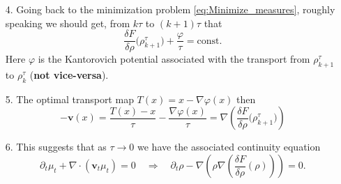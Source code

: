 \begin{enumerate}
    \item[4.] Going back to the minimization problem \eqref{eq:Minimize_measures}, roughly speaking we should get, from $k\tau$ to $(k+1)\tau$ that
    \begin{equation*}
        \frac{\delta F}{\delta \rho}\big(\rho_{k+1}^\tau\big) + \frac{\varphi}{\tau} = \mathrm{const}.
    \end{equation*}
    Here $\varphi$ is the Kantorovich potential associated with the transport from $\rho^\tau_{k+1}$ to $\rho^\tau_k$ (\textbf{not vice-versa}).
    \item[5.] The optimal transport map $T(x) = x-\nabla \varphi(x)$ then
    \begin{equation*}
        -\mathbf{v}(x) = \frac{T(x)-x}{\tau}  -\frac{\nabla \varphi(x)}{\tau} = \nabla \left(\frac{\delta F}{\delta\rho}\big(\rho_{k+1}^\tau\big)\right)
    \end{equation*}
    \item[6.] This suggests that as $\tau\to 0$ we have the associated continuity equation 
    \begin{equation*}
        \partial_t \mu_t + \nabla \cdot (\mathbf{v}_t\mu_t) = 0 \quad \Longrightarrow\quad \partial_t \rho - \nabla \left(\rho\nabla \left(\frac{\delta F}{\delta \rho}(\rho)\right)\right) = 0.
    \end{equation*}
\end{enumerate}

